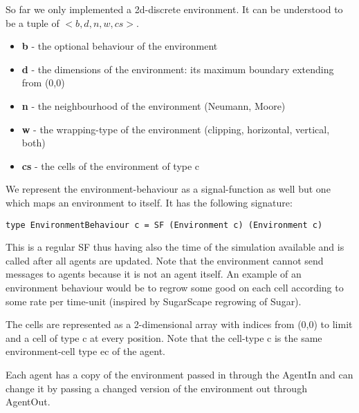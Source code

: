 So far we only implemented a 2d-discrete environment. It can be understood to be a tuple of $<b, d, n, w, cs>$.
\begin{itemize}
	\item \textbf{b} - the optional behaviour of the environment
	\item \textbf{d} - the dimensions of the environment: its maximum boundary extending from (0,0)
	\item \textbf{n} - the neighbourhood of the environment (Neumann, Moore)
	\item \textbf{w} - the wrapping-type of the environment (clipping, horizontal, vertical, both)
	\item \textbf{cs} - the cells of the environment of type c
\end{itemize}

We represent the environment-behaviour as a signal-function as well but one which maps an environment to itself. It has the following signature:
\begin{lstlisting}[]
type EnvironmentBehaviour c = SF (Environment c) (Environment c)
\end{lstlisting}
This is a regular SF thus having also the time of the simulation available and is called after all agents are updated. Note that the environment cannot send messages to agents because it is not an agent itself. An example of an environment behaviour would be to regrow some good on each cell according to some rate per time-unit (inspired by SugarScape regrowing of Sugar).

The cells are represented as a 2-dimensional array with indices from (0,0) to limit and a cell of type c at every position. Note that the cell-type c is the same environment-cell type ec of the agent.

Each agent has a copy of the environment passed in through the AgentIn and can change it by passing a changed version of the environment out through AgentOut.